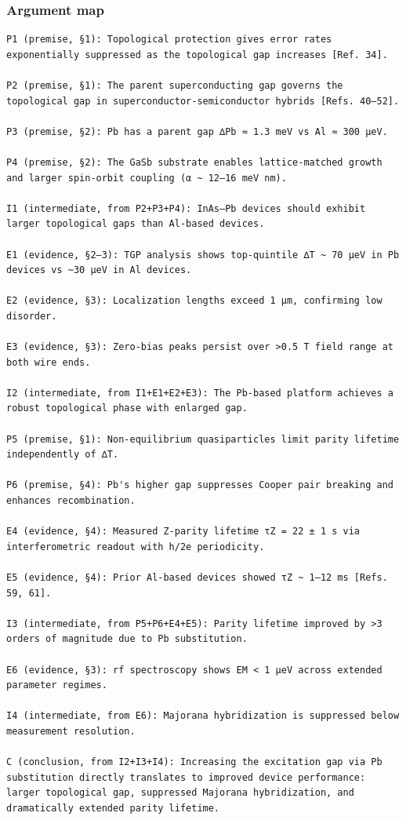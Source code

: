 \documentclass[10pt,letterpaper]{article}
\begin{document}
\hypertarget{argument-map}{%
\subsubsection{Argument map}\label{argument-map}}

\begin{verbatim}
P1 (premise, §1): Topological protection gives error rates exponentially suppressed as the topological gap increases [Ref. 34].

P2 (premise, §1): The parent superconducting gap governs the topological gap in superconductor-semiconductor hybrids [Refs. 40–52].

P3 (premise, §2): Pb has a parent gap ∆Pb ≈ 1.3 meV vs Al ≈ 300 µeV.

P4 (premise, §2): The GaSb substrate enables lattice-matched growth and larger spin-orbit coupling (α ~ 12–16 meV nm).

I1 (intermediate, from P2+P3+P4): InAs–Pb devices should exhibit larger topological gaps than Al-based devices.

E1 (evidence, §2–3): TGP analysis shows top-quintile ∆T ~ 70 µeV in Pb devices vs ~30 µeV in Al devices.

E2 (evidence, §3): Localization lengths exceed 1 µm, confirming low disorder.

E3 (evidence, §3): Zero-bias peaks persist over >0.5 T field range at both wire ends.

I2 (intermediate, from I1+E1+E2+E3): The Pb-based platform achieves a robust topological phase with enlarged gap.

P5 (premise, §1): Non-equilibrium quasiparticles limit parity lifetime independently of ∆T.

P6 (premise, §4): Pb's higher gap suppresses Cooper pair breaking and enhances recombination.

E4 (evidence, §4): Measured Z-parity lifetime τZ = 22 ± 1 s via interferometric readout with h/2e periodicity.

E5 (evidence, §4): Prior Al-based devices showed τZ ~ 1–12 ms [Refs. 59, 61].

I3 (intermediate, from P5+P6+E4+E5): Parity lifetime improved by >3 orders of magnitude due to Pb substitution.

E6 (evidence, §3): rf spectroscopy shows EM < 1 µeV across extended parameter regimes.

I4 (intermediate, from E6): Majorana hybridization is suppressed below measurement resolution.

C (conclusion, from I2+I3+I4): Increasing the excitation gap via Pb substitution directly translates to improved device performance: larger topological gap, suppressed Majorana hybridization, and dramatically extended parity lifetime.
\end{verbatim}
\end{document}
